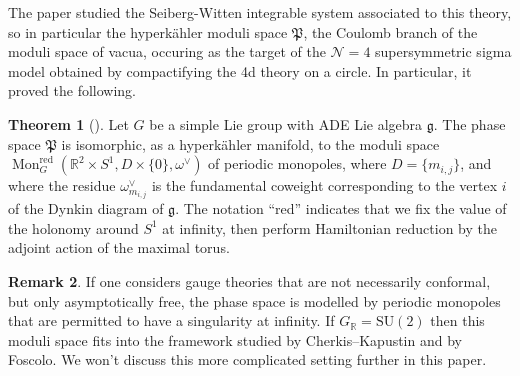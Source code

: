 \documentclass[11pt, oneside, reqno]{amsart}
\theoremstyle{definition} \newtheorem{definition}{Definition}[section]
\newtheorem{theorem}[definition]{Theorem}
\theoremstyle{definition} \newtheorem{remark}[definition]{Remark}
\theoremstyle{definition} \newtheorem{remarks}[definition]{Remarks}
\theoremstyle{definition} \newtheorem{question}[definition]{Question}
\theoremstyle{definition} \newtheorem*{note}{Note}
\theoremstyle{definition} \newtheorem{example}[definition]{Example}
\theoremstyle{definition} \newtheorem{examples}[definition]{Examples}
\renewcommand{\gg}{\mathfrak{g}}
\newcommand{\mc}[1]{\mathcal{#1}}
\newcommand{\mf}[1]{\mathfrak{#1}}
\newcommand{\RR}{\mathbb{R}}
\newcommand{\SU}{\mathrm{SU}}
\DeclareMathOperator{\mon}{Mon}
\newcommand{\red}{\mathrm{red}}
\begin{document}
The paper \cite{NekrasovPestun} studied the Seiberg-Witten integrable system associated to this theory, so in particular the hyperk\"ahler moduli space $\mf P$, the Coulomb branch of the moduli space of vacua,  occuring as the target of the $\mc N=4$ supersymmetric sigma model obtained by compactifying the 4d theory on a circle.  In particular, it proved the following.

\begin{theorem}[{\cite[Section 8.1]{NekrasovPestun}}]
Let $G$ be a simple Lie group with ADE Lie algebra $\gg$.  The phase space $\mf P$ is isomorphic, as a hyperk\"ahler manifold, to the moduli space $\mon_G^\red(\RR^2 \times S^1,D \times\{0\},\omega^\vee)$ of periodic monopoles, where $D = \{m_{i,j}\}$, and where the residue $\omega^\vee_{m_{i,j}}$ is the fundamental coweight corresponding to the vertex $i$ of the Dynkin diagram of $\gg$.  The notation ``red'' indicates that we fix the value of the holonomy around $S^1$ at infinity, then perform Hamiltonian reduction by the adjoint action of the maximal torus.
\end{theorem}

\begin{remark}
If one considers gauge theories that are not necessarily conformal, but only asymptotically free, the phase space is modelled by periodic monopoles that are permitted to have a singularity at infinity.  If $G_\RR = \SU(2)$ then this moduli space fits into the framework studied by Cherkis--Kapustin and by Foscolo.  We won't discuss this more complicated setting further in this paper.
\end{remark}
\end{document}
